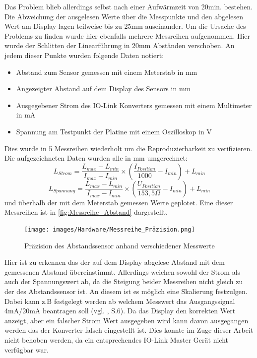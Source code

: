 Das Problem blieb allerdings selbst nach einer Aufwärmzeit von 20min. bestehen. Die Abweichung der ausgelesen Werte über die Messpunkte und den abgelesen Wert am Display lagen teilweise bis zu 25mm auseinander. Um die Ursache des Problems zu finden wurde hier ebenfalls mehrere Messreihen aufgenommen. Hier wurde der Schlitten der Linearführung in 20mm Abständen verschoben. An jedem dieser Punkte wurden folgende Daten notiert:
\begin{itemize}
	\item Abstand zum Sensor gemessen mit einem Meterstab in mm
	\item Angezeigter Abstand auf dem Display des Sensors in mm
	\item Ausgegebener Strom des IO-Link Konverters gemessen mit einem Multimeter in mA
	\item Spannung am Testpunkt der Platine mit einem Oszilloskop in V
\end{itemize}
Dies wurde in 5 Messreihen wiederholt um die Reproduzierbarkeit zu verifizieren. Die aufgezeichneten Daten wurden alle in mm umgerechnet:
\begin{equation}
	L_{Strom} = \frac{L_{max}-L_{min}}{I_{max}-I_{min}}\times(\frac{I_{Position}}{1000}-I_{min}) + L_{min}
\end{equation}
\begin{equation}
	L_{Spannung} = \frac{L_{max}-L_{min}}{I_{max}-I_{min}}\times(\frac{U_{Position}}{153,5\Omega}-I_{min}) + L_{min}
\end{equation}
und überhalb der mit dem Meterstab gemessen Werte geplotet. Eine dieser Messreihen ist in \autoref{fig:Messreihe_Abstand} dargestellt.
\begin{figure}[H]
	\centering
	\texttt{[image: images/Hardware/Messreihe\_Präzision.png]}
	\caption{Präzision des Abstandssensor anhand verschiedener Messwerte}
	\label{fig:Messreihe_Abstand}
\end{figure}
\noindent Hier ist zu erkennen das der auf dem Display abgelese Abstand mit dem gemessenen Abstand übereinstimmt. Allerdings weichen sowohl der Strom als auch der Spannungswert ab, da die Steigung beider Messreihen nicht gleich zu der des Abstandssensor ist. An diesem ist es möglich eine Skalierung festzulgen. Dabei kann z.B festgelegt werden ab welchem Messwert das Ausgangssignal 4mA/20mA beantragen soll (vgl. \cite{EIO104_Manual}, S.6). Da das Display den korrekten Wert anzeigt, aber ein falscher Strom Wert ausgegeben wird kann davon ausgegangen werden das der Konverter falsch eingestellt ist. Dies konnte im Zuge dieser Arbeit nicht behoben werden, da ein entsprechendes IO-Link Master Gerät nicht verfügbar war.
